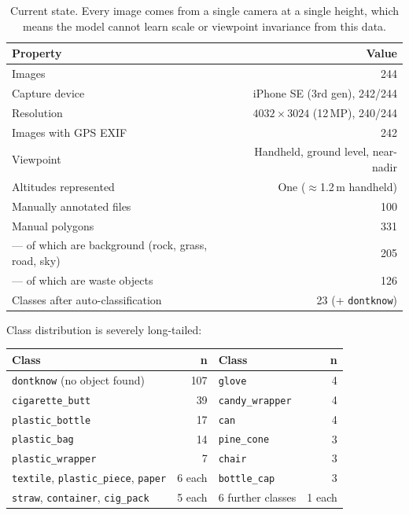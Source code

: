 \documentclass[11pt,a4paper]{article}
\begin{document}
\begin{table}[H]
\centering
\begin{tabular}{lr}
\toprule
\textbf{Property} & \textbf{Value} \\
\midrule
Images & 244 \\
Capture device & iPhone SE (3rd gen), 242/244 \\
Resolution & $4032\times3024$ (12\,MP), 240/244 \\
Images with GPS EXIF & 242 \\
Viewpoint & Handheld, ground level, near-nadir \\
Altitudes represented & One ($\approx$1.2\,m handheld) \\
Manually annotated files & 100 \\
Manual polygons & 331 \\
--- of which are background (rock, grass, road, sky) & 205 \\
--- of which are waste objects & 126 \\
Classes after auto-classification & 23 (+ \texttt{dontknow}) \\
\bottomrule
\end{tabular}
\caption{Current state. Every image comes from a single camera at a single
height, which means the model cannot learn scale or viewpoint invariance from
this data.}
\end{table}

\noindent Class distribution is severely long-tailed:

\begin{center}
\begin{tabular}{lr@{\hskip 1.2cm}lr}
\toprule
\textbf{Class} & \textbf{n} & \textbf{Class} & \textbf{n} \\
\midrule
\texttt{dontknow} (no object found) & 107 & \texttt{glove} & 4 \\
\texttt{cigarette\_butt} & 39 & \texttt{candy\_wrapper} & 4 \\
\texttt{plastic\_bottle} & 17 & \texttt{can} & 4 \\
\texttt{plastic\_bag} & 14 & \texttt{pine\_cone} & 3 \\
\texttt{plastic\_wrapper} & 7 & \texttt{chair} & 3 \\
\texttt{textile}, \texttt{plastic\_piece}, \texttt{paper} & 6 each & \texttt{bottle\_cap} & 3 \\
\texttt{straw}, \texttt{container}, \texttt{cig\_pack} & 5 each & 6 further classes & 1 each \\
\bottomrule
\end{tabular}
\end{center}
\end{document}
